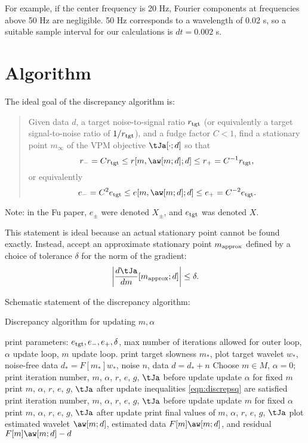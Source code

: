 For example, if the center frequency is 20 Hz, Fourier components at frequencies above 50 Hz are negligible. 50 Hz corresponds to a wavelength of 0.02 s, so a suitable sample interval for our calculations is $dt = 0.002$ s.

\section{Algorithm}
The ideal goal of the discrepancy algorithm is:

\begin{quote}
  Given data $d$, a target noise-to-signal ratio $r_{\rm tgt}$ (or equivalently a target signal-to-noise ratio of $1/r_{\rm tgt}$), and a fudge factor $C<1$, find a stationary point $m_{\infty}$ of the VPM objective $\tJa[\cdot;d]$ so that
\begin{equation}
  \label{eqn:discrep}
  r_-=Cr_{\rm tgt} \le r[m,\aw[m;d];d] \le r_+= C^{-1}r_{\rm tgt}, 
\end{equation}
or equivalently
\begin{equation}
  \label{eqn:discrepsq}
  e_-=C^2e_{\rm tgt} \le e[m,\aw[m;d];d] \le e_+=C^{-2}e_{\rm tgt}.
\end{equation}
\end{quote}
Note: in the Fu paper, $e_{\pm}$ were denoted $X_{\pm}$, and $e_{\rm tgt}$ was denoted $X$.

This statement is ideal because an actual stationary point cannot be found exactly. Instead, accept an approximate stationary point $m_{\rm approx}$ defined by a choice of tolerance $\delta$ for the norm of the gradient:
\begin{equation}
  \label{eqn:approx}
  \left|\frac{d \tJa}{dm}[m_{\rm approx};d]\right| \le \delta.
\end{equation}

Schematic statement of the discrepancy algorithm:
\begin{algorithm}[H]
\caption{Discrepancy algorithm for updating $m, \alpha$}
\begin{algorithmic}[1]
  \State print parameters: $e_{\rm tgt},e_-,e_+,\delta$, max number of iterations allowed for outer loop, $\alpha$ update loop, $m$ update loop.
  \State print target slowness $m_*$, plot target wavelet $w_*$, noise-free data $d_*=F[m_*]w_*$, noise $n$, data $d=d_*+n$
  \State Choose $m\in M$, $\alpha=0$;
  \Repeat
  \Repeat
  \State print iteration number, $m$, $\alpha$, $r$, $e$, $g$, $\tJa$ before update
  \State update $\alpha$ for fixed $m$
  \State print $m$, $\alpha$, $r$, $e$, $g$, $\tJa$ after update  
  \Until inequalities \ref{eqn:discrepsq} are satisfied
  \Repeat
  \State print iteration number, $m$, $\alpha$, $r$, $e$, $g$, $\tJa$ before update
  \State update $m$ for fixed $\alpha$
  \State print $m$, $\alpha$, $r$, $e$, $g$, $\tJa$ after update  
  \State print final values of $m$, $\alpha$, $r$, $e$, $g$, $\tJa$
  \State plot estimated wavelet $\aw[m;d]$, estimated data $F[m]\aw[m;d]$, and residual $F[m]\aw[m;d]-d$
\end{algorithmic}
\end{algorithm}

